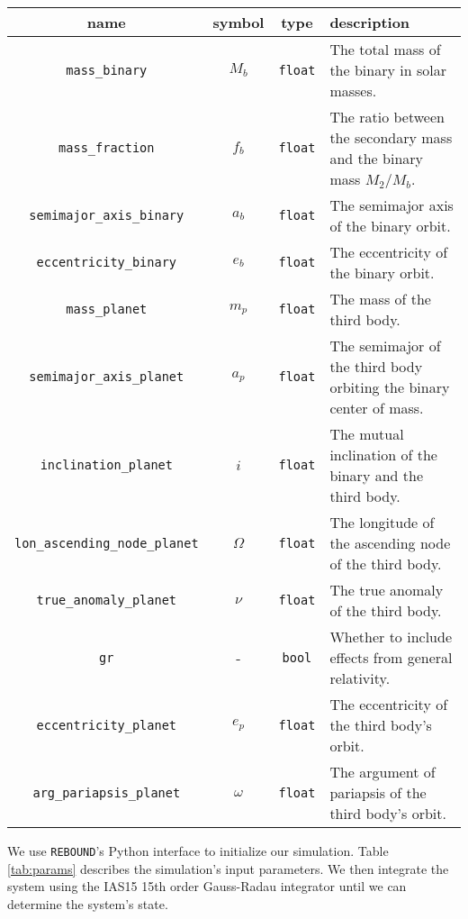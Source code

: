 \documentclass[twocolumn]{aastex631}
\begin{document}
\begin{table*}
    \begin{tabular}{cccp{}}
        \hline
        name & symbol & type & description \\
        \hline
        \texttt{mass\_binary} & $M_b$ & \texttt{float} & The total mass of the binary in solar masses. \\
        \texttt{mass\_fraction} & $f_b$ & \texttt{float} & The ratio between the secondary mass and the binary mass $M_2/M_b$. \\
        \texttt{semimajor\_axis\_binary} & $a_b$ & \texttt{float} & The semimajor axis of the binary orbit. \\
        \texttt{eccentricity\_binary} & $e_b$ & \texttt{float} & The eccentricity of the binary orbit. \\
        \texttt{mass\_planet} & $m_p$ & \texttt{float} & The mass of the third body. \\
        \texttt{semimajor\_axis\_planet} & $a_p$ & \texttt{float} & The semimajor of the third body orbiting the binary center of mass. \\
        \texttt{inclination\_planet} & $i$ & \texttt{float} & The mutual inclination of the binary and the third body. \\
        \texttt{lon\_ascending\_node\_planet} & $\Omega$ & \texttt{float} & The longitude of the ascending node of the third body. \\
        \texttt{true\_anomaly\_planet} & $\nu$ & \texttt{float} & The true anomaly of the third body. \\
        \texttt{gr} & - & \texttt{bool} & Whether to include effects from general relativity. \\
        \texttt{eccentricity\_planet} & $e_p$ & \texttt{float} & The eccentricity of the third body's orbit. \\
        \texttt{arg\_pariapsis\_planet} & $\omega$ & \texttt{float} & The argument of pariapsis of the third body's orbit. \\
        \hline
    \end{tabular}
    \caption{Simulation parameters}
    \label{tab:params}
\end{table*}

We use \texttt{REBOUND}'s Python interface to initialize our simulation. Table \ref{tab:params} describes the simulation's
input parameters. We then integrate the system using the IAS15 15th order Gauss-Radau integrator \citep{reboundias15}
until we can determine the system's state.
\end{document}
